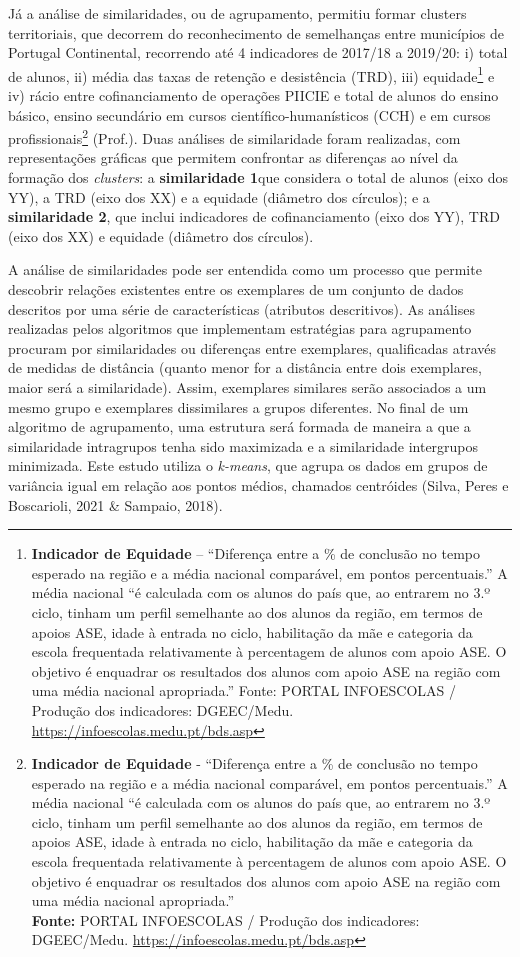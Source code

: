 \documentclass[
]{book}
\begin{document}
Já a análise de similaridades, ou de agrupamento, permitiu formar clusters territoriais, que decorrem do reconhecimento de semelhanças entre municípios de Portugal Continental, recorrendo até 4 indicadores de 2017/18 a 2019/20: i) total de alunos, ii) média das taxas de retenção e desistência (TRD), iii) equidade\footnote{\textbf{Indicador de Equidade} -- ``Diferença entre a \% de conclusão no tempo esperado na região e a média nacional comparável, em pontos percentuais.'' A média nacional ``é calculada com os alunos do país que, ao entrarem no 3.º ciclo, tinham um perfil semelhante ao dos alunos da região, em termos de apoios ASE, idade à entrada no ciclo, habilitação da mãe e categoria da escola frequentada relativamente à percentagem de alunos com apoio ASE. O objetivo é enquadrar os resultados dos alunos com apoio ASE na região com uma média nacional apropriada.'' Fonte: PORTAL INFOESCOLAS / Produção dos indicadores: DGEEC/Medu. \url{https://infoescolas.medu.pt/bds.asp}} e iv) rácio entre cofinanciamento de operações PIICIE e total de alunos do ensino básico, ensino secundário em cursos científico-humanísticos (CCH) e em cursos profissionais\footnote{\textbf{Indicador de Equidade} - ``Diferença entre a \% de conclusão no tempo esperado na região e a média nacional comparável, em pontos percentuais.'' A média nacional ``é calculada com os alunos do país que, ao entrarem no 3.º ciclo, tinham um perfil semelhante ao dos alunos da região, em termos de apoios ASE, idade à entrada no ciclo, habilitação da mãe e categoria da escola frequentada relativamente à percentagem de alunos com apoio ASE. O objetivo é enquadrar os resultados dos alunos com apoio ASE na região com uma média nacional apropriada.''\\
  \textbf{Fonte:} PORTAL INFOESCOLAS / Produção dos indicadores: DGEEC/Medu. \url{https://infoescolas.medu.pt/bds.asp}} (Prof.). Duas análises de similaridade foram realizadas, com representações gráficas que permitem confrontar as diferenças ao nível da formação dos \emph{clusters}: a \textbf{similaridade 1}que considera o total de alunos (eixo dos YY), a TRD (eixo dos XX) e a equidade (diâmetro dos círculos); e a \textbf{similaridade 2}, que inclui indicadores de cofinanciamento (eixo dos YY), TRD (eixo dos XX) e equidade (diâmetro dos círculos).

A análise de similaridades pode ser entendida como um processo que permite descobrir relações existentes entre os exemplares de um conjunto de dados descritos por uma série de características (atributos descritivos). As análises realizadas pelos algoritmos que implementam estratégias para agrupamento procuram por similaridades ou diferenças entre exemplares, qualificadas através de medidas de distância (quanto menor for a distância entre dois exemplares, maior será a similaridade). Assim, exemplares similares serão associados a um mesmo grupo e exemplares dissimilares a grupos diferentes. No final de um algoritmo de agrupamento, uma estrutura será formada de maneira a que a similaridade intragrupos tenha sido maximizada e a similaridade intergrupos minimizada. Este estudo utiliza o \emph{k-means}, que agrupa os dados em grupos de variância igual em relação aos pontos médios, chamados centróides (Silva, Peres e Boscarioli, 2021 \& Sampaio, 2018).
\end{document}
